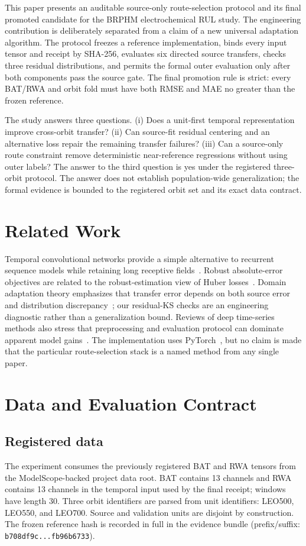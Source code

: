 \documentclass[conference]{IEEEtran}
\begin{document}
This paper presents an auditable source-only route-selection protocol and its final promoted candidate for the BRPHM electrochemical RUL study. The engineering contribution is deliberately separated from a claim of a new universal adaptation algorithm. The protocol freezes a reference implementation, binds every input tensor and receipt by SHA-256, evaluates six directed source transfers, checks three residual distributions, and permits the formal outer evaluation only after both components pass the source gate. The final promotion rule is strict: every BAT/RWA and orbit fold must have both RMSE and MAE no greater than the frozen reference.

The study answers three questions. (i) Does a unit-first temporal representation improve cross-orbit transfer? (ii) Can source-fit residual centering and an alternative loss repair the remaining transfer failures? (iii) Can a source-only route constraint remove deterministic near-reference regressions without using outer labels? The answer to the third question is yes under the registered three-orbit protocol. The answer does not establish population-wide generalization; the formal evidence is bounded to the registered orbit set and its exact data contract.

\section{Related Work}
Temporal convolutional networks provide a simple alternative to recurrent sequence models while retaining long receptive fields~\cite{bai2018tcn}. Robust absolute-error objectives are related to the robust-estimation view of Huber losses~\cite{huber1964}. Domain adaptation theory emphasizes that transfer error depends on both source error and distribution discrepancy~\cite{ben2010domain}; our residual-KS checks are an engineering diagnostic rather than a generalization bound. Reviews of deep time-series methods also stress that preprocessing and evaluation protocol can dominate apparent model gains~\cite{fawaz2019review}. The implementation uses PyTorch~\cite{paszke2019pytorch}, but no claim is made that the particular route-selection stack is a named method from any single paper.

\section{Data and Evaluation Contract}
\subsection{Registered data}
The experiment consumes the previously registered BAT and RWA tensors from the ModelScope-backed project data root. BAT contains 13 channels and RWA contains 13 channels in the temporal input used by the final receipt; windows have length 30. Three orbit identifiers are parsed from unit identifiers: LEO500, LEO550, and LEO700. Source and validation units are disjoint by construction. The frozen reference hash is recorded in full in the evidence bundle (prefix/suffix: \texttt{b708df9c...fb96b6733}).
\end{document}
